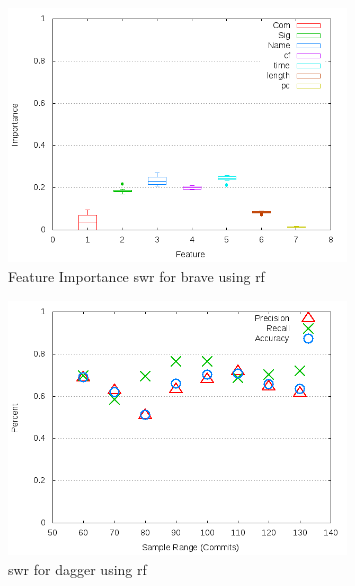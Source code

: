 \begin{figure}[!t]
\centering
\includegraphics[width=0.8\textwidth]{images/rf/test_1/brave_importance.png}
\caption{Feature Importance \gls{swr} for brave using \gls{rf}}
\label{fig:test_1_brave_rf_importance}
\end{figure}

\begin{figure}[!t]
\centering
\includegraphics[width=0.8\textwidth]{images/rf/test_1/dagger_sample_range.png}
\caption{\gls{swr} for dagger using \gls{rf}}
\label{fig:test_1_dagger_rf}
\end{figure}

